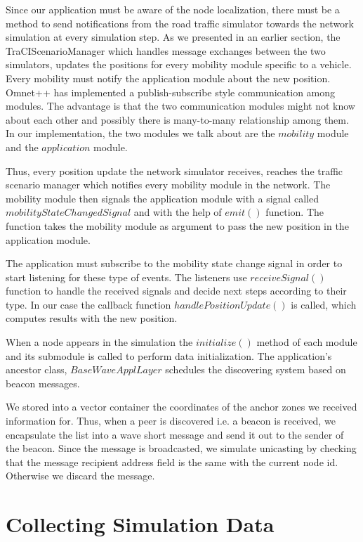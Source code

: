 Since our application must be aware of the node localization, there must be a
method to send notifications from the road traffic simulator towards the network
simulation at every simulation step. As we presented in an earlier section, the
TraCIScenarioManager which handles message exchanges between the two simulators,
updates the positions for every mobility module specific to a vehicle. Every
mobility must notify the application module about the new position. Omnet++ has
implemented a publish-subscribe style communication among modules. The advantage
is that the two communication modules might not know about each other and
possibly there is many-to-many relationship among them. In our implementation,
the two modules we talk about are the $mobility$ module and the $application$
module.

Thus, every position update the network simulator receives, reaches the
traffic scenario manager which notifies every mobility module in the network.
The mobility module then signals the application module with a signal called
$mobilityStateChangedSignal$ and with the help of $emit()$ function. The function
takes the mobility module as argument to pass the new position in the
application module.

The application must subscribe to the mobility state change signal in order
to start listening for these type of events. The listeners use $receiveSignal()$
function to handle the received signals and decide next steps according to their
type. In our case the callback function $handlePositionUpdate()$ is called, which
computes results with the new position.

When a node appears in the simulation the $initialize()$ method of each module
and its submodule is called to perform data initialization. The application's
ancestor class, $BaseWaveApplLayer$ schedules the discovering system based on
beacon messages.

We stored into a vector container the coordinates of the anchor zones we
received information for. Thus, when a peer is discovered i.e. a beacon is
received, we encapsulate the list into a wave short message and send it out to
the sender of the beacon. Since the message is broadcasted, we simulate
unicasting by checking that the message recipient address field is the same with
the current node id. Otherwise we discard the message.

\section {Collecting Simulation Data}

